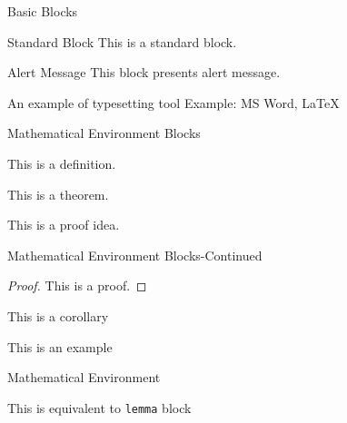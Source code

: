 \documentclass{beamer}
\begin{document}
\begin{frame}{Basic Blocks}
  \begin{block}{Standard Block}
    This is a standard block.
  \end{block}
  \begin{alertblock}{Alert Message}
    This block presents alert message.
  \end{alertblock}
  \begin{exampleblock}{An example of typesetting tool}
    Example: MS Word, \LaTeX{}
  \end{exampleblock}
\end{frame}
\begin{frame}{Mathematical Environment Blocks}
  \begin{definition} 
    This is a definition.
  \end{definition}
  
  \begin{theorem} 
    This is a theorem. 
  \end{theorem}
  
  \begin{lemma} 
    This is a proof idea.
  \end{lemma}
\end{frame}
\begin{frame}{Mathematical Environment Blocks-Continued}
  \begin{proof} 
    This is a proof. 
  \end{proof}
  
  \begin{corollary}
    This is a corollary
  \end{corollary}
  
  \begin{example}
    This is an example 
  \end{example}
\end{frame}

\begin{frame}[fragile]{Mathematical Environment}
  \begin{Lemma} 
    This is equivalent to \verb|lemma| block
  \end{Lemma}  
\end{frame}

\end{document}
